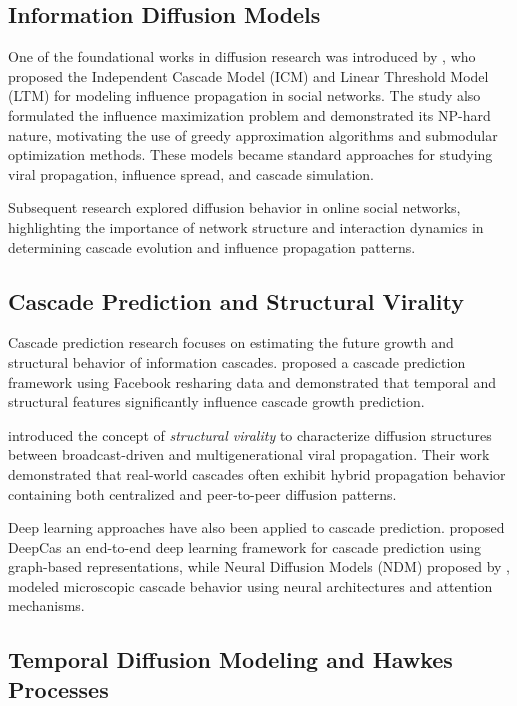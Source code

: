 \documentclass{article}
\begin{document}
\subsection{Information Diffusion Models}

One of the foundational works in diffusion research was introduced by \cite{kempe2003maximizing}, who proposed the Independent Cascade Model (ICM) and Linear Threshold Model (LTM) for modeling influence propagation in social networks. The study also formulated the influence maximization problem and demonstrated its NP-hard nature, motivating the use of greedy approximation algorithms and submodular optimization methods. These models became standard approaches for studying viral propagation, influence spread, and cascade simulation.

Subsequent research explored diffusion behavior in online social networks, highlighting the importance of network structure and interaction dynamics in determining cascade evolution and influence propagation patterns.

\subsection{Cascade Prediction and Structural Virality}

Cascade prediction research focuses on estimating the future growth and structural behavior of information cascades. \cite{cheng2014can} proposed a cascade prediction framework using Facebook resharing data and demonstrated that temporal and structural features significantly influence cascade growth prediction.

\cite{goel2016structural} introduced the concept of \textit{structural virality} to characterize diffusion structures between broadcast-driven and multigenerational viral propagation. Their work demonstrated that real-world cascades often exhibit hybrid propagation behavior containing both centralized and peer-to-peer diffusion patterns.

Deep learning approaches have also been applied to cascade prediction. \cite{li2017deepcas} proposed DeepCas an end-to-end deep learning framework for cascade prediction using graph-based representations, while Neural Diffusion Models (NDM) proposed by \cite{yang2018neural}, modeled microscopic cascade behavior using neural architectures and attention mechanisms.

\subsection{Temporal Diffusion Modeling and Hawkes Processes}
\end{document}

